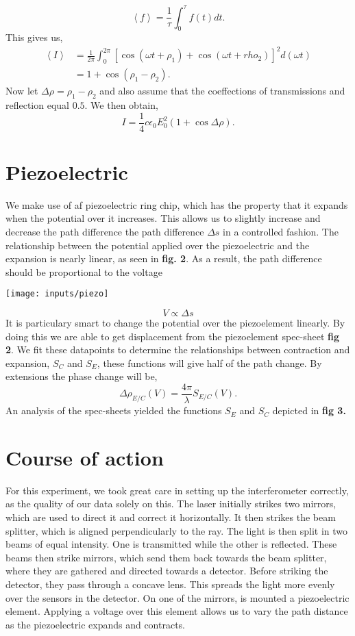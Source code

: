 \documentclass[working, oneside]{inputs/tuftebook}
\begin{document}
\[
\left<f \right> = \frac{1}{\tau} \int_{0}^{\tau}f\left( t \right) dt  
.\]
This gives us,
\begin{align*}
\left<I \right> &=  \frac{1}{2\pi} \int_{0}^{2\pi} \left[ \cos\left( \omega t + \rho_1 \right) + \cos\left( \omega t + rho_2 \right)   \right] ^2 d \left( \omega t \right)  \\
&=  1+ \cos\left( \rho _1 - \rho_2  \right)  
.\end{align*}
Now let $ \Delta \rho = \rho_1 - \rho_2$ and also assume that the coeffections of transmissions and reflection equal $0.5$. We then obtain,
 \[
I = \frac{1}{4}c\epsilon_0 E_0^2 \left( 1 + \cos \Delta \rho  \right) 
.\]
\section*{Piezoelectric}
We make use of af piezoelectric ring chip, which has the property that it expands when the potential over it increases. This allows us to slightly increase and decrease the path difference the path difference $\Delta s$ in a controlled fashion. The relationship between the potential applied over the piezoelectric and the expansion is nearly linear, as seen in \textbf{fig. 2}. As a result, the path difference should be proportional to the voltage
\begin{marginfigure}
	\centering
	\texttt{[image: inputs/piezo]}
	\caption{}
	\label{fig:}
\end{marginfigure}
\[
V \propto \Delta s
\]
It is particulary smart to change the potential over the piezoelement linearly. By doing this we are able to get displacement from the piezoelement spec-sheet \textbf{fig 2}. We fit these datapoints to determine the relationships between contraction and expansion, $S_C$ and $S_E$, these functions will give half of the path change. By extensions the phase change will be,
 \[
\Delta \rho_{E /C} \left( V \right) =  \frac{4\pi}{\lambda}S_{E /C}\left( V \right) 
.\] 
An analysis of the spec-sheets yielded the functions $S_E$ and  $S_C$ depicted in \textbf{fig 3.} 
\section*{Course of action}
For this experiment, we took great care in setting up the interferometer correctly, as the quality of our data solely on this. The laser initially strikes two mirrors, which are used to direct it and correct it horizontally. It then strikes the beam splitter, which is aligned perpendicularly to the ray. The light is then split in two beams of equal intensity. One is transmitted while the other is reflected. These beams then strike mirrors, which send them back towards the beam splitter, where they are gathered and directed towards a detector. Before striking the detector, they pass through a concave lens. This spreads the light more evenly over the sensors in the detector. On one of the mirrors, is mounted a piezoelectric element. Applying a voltage over this element allows us to vary the path distance as the piezoelectric expands and contracts. 
\end{document}
